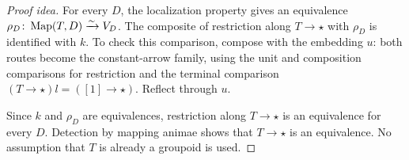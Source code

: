 \documentclass[11pt]{article}
\begin{document}
\begin{proof}[Proof idea]
For every $D$, the localization property gives an equivalence
$\rho_D\colon\operatorname{Map}(T,D)\xrightarrow{\sim} V_D$.
The composite of restriction along $T\to\star$ with $\rho_D$ is
identified with $k$. To check this comparison, compose with the embedding
$u$: both routes become the constant-arrow family, using the unit and
composition comparisons for restriction and the terminal comparison
$(T\to\star)l=([1]\to\star)$. Reflect through $u$.

Since $k$ and $\rho_D$ are equivalences, restriction along $T\to\star$
is an equivalence for every $D$. Detection by mapping animae shows that
$T\to\star$ is an equivalence. No assumption that $T$ is already a
groupoid is used.
\end{proof}
\end{document}
